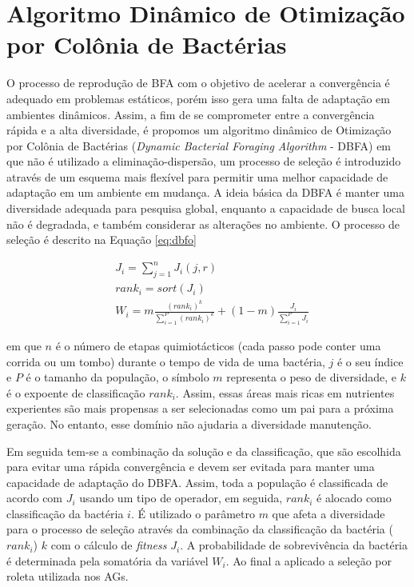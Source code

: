 \section{Algoritmo Dinâmico de Otimização por Colônia de Bactérias}
\label{sec:bfo_behaviour}

O processo de reprodução de BFA com o objetivo de acelerar a convergência é adequado em problemas estáticos, porém isso gera uma falta de adaptação em ambientes dinâmicos. Assim, a fim de se comprometer entre a convergência rápida e a alta diversidade, é propomos um algoritmo dinâmico de Otimização por Colônia de Bactérias (\textit{Dynamic Bacterial Foraging Algorithm} - DBFA) \cite{passino2002biomimicry} em que não é utilizado a eliminação-dispersão, um processo de seleção é introduzido através de um esquema mais flexível para permitir uma melhor capacidade de adaptação em um ambiente em mudança. A ideia básica da DBFA é manter uma diversidade adequada para pesquisa global, enquanto a capacidade de busca local não é degradada, e também considerar as alterações no ambiente. O processo de seleção é descrito na Equação \ref{eq:dbfo}

\begin{equation}
\label{eq:dbfo}
\begin{split}
& J_i = \sum_{j=1}^{n} J_i(j,r) \\
& rank_i = sort(J_i) \\
& W_i = m \frac{(rank_i)^k}{\sum_{i=1}^{P} (rank_i)^k} + (1 - m) \frac{J_i}{\sum_{i=1}^{P} J_i}
\end{split}
\end{equation}

\noindent em que $n$ é o número de etapas quimiotácticos (cada passo pode conter uma corrida ou um tombo) durante o tempo de vida de uma bactéria, $j$ é o seu índice e $P$ é o tamanho da população, o símbolo $m$ representa o peso de diversidade, e $k$ é o expoente de classificação $rank_i$. Assim, essas áreas mais ricas em nutrientes experientes são mais propensas a ser selecionadas como um pai para a próxima geração. No entanto, esse domínio não ajudaria a diversidade manutenção.

Em seguida tem-se a combinação da solução e da classificação, que são escolhida para evitar uma rápida convergência e devem ser evitada para manter uma capacidade de adaptação do DBFA. Assim, toda a população é classificada de acordo com $J_i$ usando um tipo de operador, em seguida, $rank_i$ é alocado como classificação da bactéria $i$. É utilizado o parâmetro $m$ que afeta a diversidade para o processo de seleção através da combinação da classificação da bactéria ($rank_i$) $k$ com o cálculo de \textit{fitness} $J_i$. A probabilidade de sobrevivência da bactéria é determinada pela somatória da variável $W_i$. Ao final a aplicado a seleção por roleta utilizada nos AGs.

